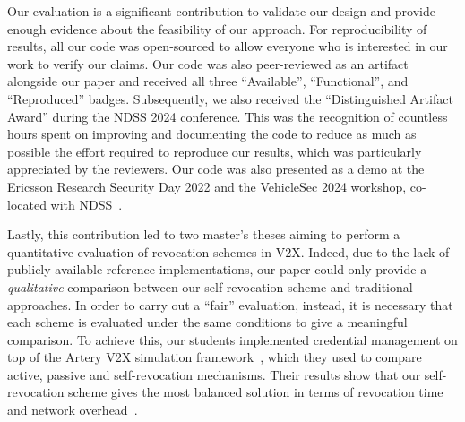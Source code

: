Our evaluation is a significant contribution to validate our design and provide
enough evidence about the feasibility of our approach. For reproducibility of
results, all our code was open-sourced to allow everyone who is interested in
our work to verify our claims. Our code was also peer-reviewed as an artifact
alongside our paper and received all three ``Available'', ``Functional'', and
``Reproduced'' badges. Subsequently, we also received the ``Distinguished
Artifact Award'' during the NDSS 2024 conference. This was the recognition of
countless hours spent on improving and documenting the code to reduce as much as
possible the effort required to reproduce our results, which was particularly
appreciated by the reviewers. Our code was also presented as a demo at the
Ericsson Research Security Day 2022 and the VehicleSec 2024 workshop, co-located
with NDSS~\cite{scopelliti2024demo}.

Lastly, this contribution led to two master's theses aiming to perform a
quantitative evaluation of revocation schemes in \ac{V2X}. Indeed, due to the
lack of publicly available reference implementations, our paper could only
provide a \emph{qualitative} comparison between our self-revocation scheme and
traditional approaches. In order to carry out a ``fair'' evaluation, instead, it
is necessary that each scheme is evaluated under the same conditions to give a
meaningful comparison. To achieve this, our students implemented credential
management on top of the Artery \ac{V2X} simulation
framework~\cite{riebl2015artery}, which they used to compare active, passive and
self-revocation mechanisms. Their results show that our self-revocation scheme
gives the most balanced solution in terms of revocation time and network
overhead~\cite{dehaes2024thesis,orban2024thesis}.